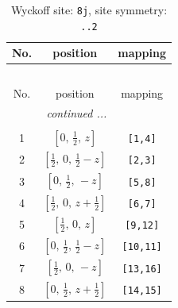 \documentclass[fleqn,8pt]{jsarticle}
\begin{document}
\begin{longtable}{ccc}
\caption{Wyckoff site: {\tt 8j}, site symmetry: {\tt ..2}}
 \\
 \hline \hline
No. & position & mapping \\ \hline \endfirsthead

\multicolumn{2}{l}{\tablename\ \thetable{}} \\
 \hline \hline
No. & position & mapping \\ \hline \endhead

 \hline \hline
\multicolumn{2}{r}{\footnotesize\it continued ...} \\ \endfoot

 \hline \hline
\multicolumn{2}{r}{} \\ \endlastfoot

1 & $\left[ 0,\, \frac{1}{2},\, z \right]$ & {\tt [1,4]} \\ \hline
2 & $\left[ \frac{1}{2},\, 0,\, \frac{1}{2} - z \right]$ & {\tt [2,3]} \\ \hline
3 & $\left[ 0,\, \frac{1}{2},\, - z \right]$ & {\tt [5,8]} \\ \hline
4 & $\left[ \frac{1}{2},\, 0,\, z + \frac{1}{2} \right]$ & {\tt [6,7]} \\ \hline
5 & $\left[ \frac{1}{2},\, 0,\, z \right]$ & {\tt [9,12]} \\ \hline
6 & $\left[ 0,\, \frac{1}{2},\, \frac{1}{2} - z \right]$ & {\tt [10,11]} \\ \hline
7 & $\left[ \frac{1}{2},\, 0,\, - z \right]$ & {\tt [13,16]} \\ \hline
8 & $\left[ 0,\, \frac{1}{2},\, z + \frac{1}{2} \right]$ & {\tt [14,15]} \\
\end{longtable}
\renewcommand{\arraystretch}{1.2}
\end{document}
